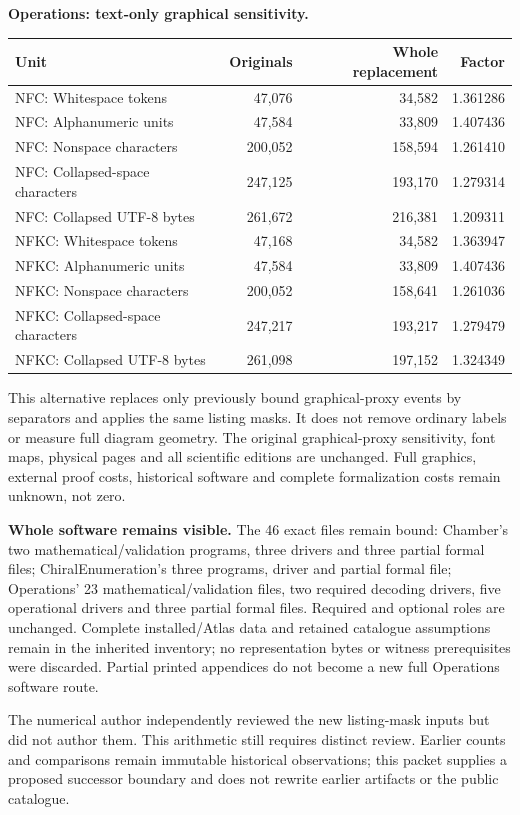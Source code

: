 \documentclass[11pt,a4paper]{article}
\begin{document}
\textbf{Operations: text-only graphical sensitivity.}
\begin{center}\small\begin{tabular}{lrrr}\toprule
Unit & Originals & Whole replacement & Factor\\\midrule
NFC: Whitespace tokens & 47,076 & 34,582 & 1.361286\\
NFC: Alphanumeric units & 47,584 & 33,809 & 1.407436\\
NFC: Nonspace characters & 200,052 & 158,594 & 1.261410\\
NFC: Collapsed-space characters & 247,125 & 193,170 & 1.279314\\
NFC: Collapsed UTF-8 bytes & 261,672 & 216,381 & 1.209311\\
NFKC: Whitespace tokens & 47,168 & 34,582 & 1.363947\\
NFKC: Alphanumeric units & 47,584 & 33,809 & 1.407436\\
NFKC: Nonspace characters & 200,052 & 158,641 & 1.261036\\
NFKC: Collapsed-space characters & 247,217 & 193,217 & 1.279479\\
NFKC: Collapsed UTF-8 bytes & 261,098 & 197,152 & 1.324349\\
\bottomrule\end{tabular}\end{center}
This alternative replaces only previously bound graphical-proxy events by separators and applies the same listing masks. It does not remove ordinary labels or measure full diagram geometry. The original graphical-proxy sensitivity, font maps, physical pages and all scientific editions are unchanged. Full graphics, external proof costs, historical software and complete formalization costs remain unknown, not zero.

\textbf{Whole software remains visible.} The 46 exact files remain bound: Chamber's two mathematical/validation programs, three drivers and three partial formal files; ChiralEnumeration's three programs, driver and partial formal file; Operations' 23 mathematical/validation files, two required decoding drivers, five operational drivers and three partial formal files. Required and optional roles are unchanged. Complete installed/Atlas data and retained catalogue assumptions remain in the inherited inventory; no representation bytes or witness prerequisites were discarded. Partial printed appendices do not become a new full Operations software route.

The numerical author independently reviewed the new listing-mask inputs but did not author them. This arithmetic still requires distinct review. Earlier counts and comparisons remain immutable historical observations; this packet supplies a proposed successor boundary and does not rewrite earlier artifacts or the public catalogue.
\end{document}

